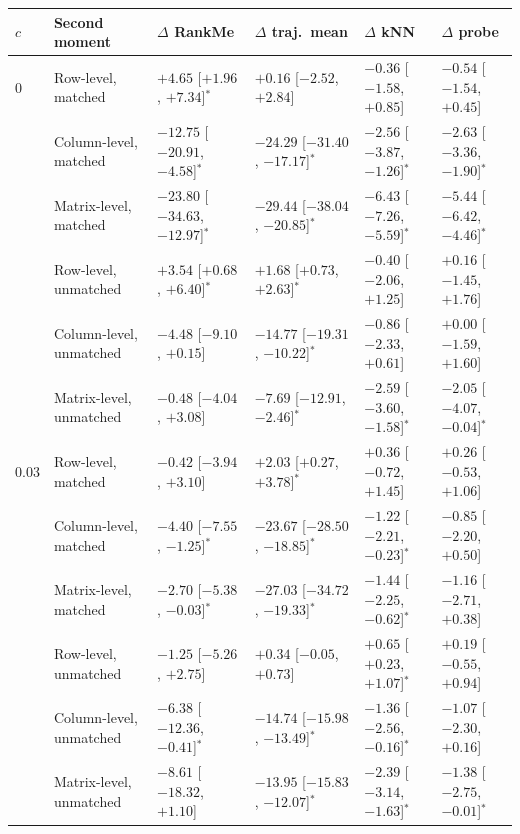 \begin{tabular}{llllll}
\toprule
$c$ & Second moment & $\Delta$ RankMe & $\Delta$ traj.\ mean & $\Delta$ kNN & $\Delta$ probe \\
\midrule
0 & Row-level, matched & $+4.65$ [$+1.96$, $+7.34$]$^{*}$ & $+0.16$ [$-2.52$, $+2.84$] & $-0.36$ [$-1.58$, $+0.85$] & $-0.54$ [$-1.54$, $+0.45$] \\
 & Column-level, matched & $-12.75$ [$-20.91$, $-4.58$]$^{*}$ & $-24.29$ [$-31.40$, $-17.17$]$^{*}$ & $-2.56$ [$-3.87$, $-1.26$]$^{*}$ & $-2.63$ [$-3.36$, $-1.90$]$^{*}$ \\
 & Matrix-level, matched & $-23.80$ [$-34.63$, $-12.97$]$^{*}$ & $-29.44$ [$-38.04$, $-20.85$]$^{*}$ & $-6.43$ [$-7.26$, $-5.59$]$^{*}$ & $-5.44$ [$-6.42$, $-4.46$]$^{*}$ \\
 & Row-level, unmatched & $+3.54$ [$+0.68$, $+6.40$]$^{*}$ & $+1.68$ [$+0.73$, $+2.63$]$^{*}$ & $-0.40$ [$-2.06$, $+1.25$] & $+0.16$ [$-1.45$, $+1.76$] \\
 & Column-level, unmatched & $-4.48$ [$-9.10$, $+0.15$] & $-14.77$ [$-19.31$, $-10.22$]$^{*}$ & $-0.86$ [$-2.33$, $+0.61$] & $+0.00$ [$-1.59$, $+1.60$] \\
 & Matrix-level, unmatched & $-0.48$ [$-4.04$, $+3.08$] & $-7.69$ [$-12.91$, $-2.46$]$^{*}$ & $-2.59$ [$-3.60$, $-1.58$]$^{*}$ & $-2.05$ [$-4.07$, $-0.04$]$^{*}$ \\
\midrule
0.03 & Row-level, matched & $-0.42$ [$-3.94$, $+3.10$] & $+2.03$ [$+0.27$, $+3.78$]$^{*}$ & $+0.36$ [$-0.72$, $+1.45$] & $+0.26$ [$-0.53$, $+1.06$] \\
 & Column-level, matched & $-4.40$ [$-7.55$, $-1.25$]$^{*}$ & $-23.67$ [$-28.50$, $-18.85$]$^{*}$ & $-1.22$ [$-2.21$, $-0.23$]$^{*}$ & $-0.85$ [$-2.20$, $+0.50$] \\
 & Matrix-level, matched & $-2.70$ [$-5.38$, $-0.03$]$^{*}$ & $-27.03$ [$-34.72$, $-19.33$]$^{*}$ & $-1.44$ [$-2.25$, $-0.62$]$^{*}$ & $-1.16$ [$-2.71$, $+0.38$] \\
 & Row-level, unmatched & $-1.25$ [$-5.26$, $+2.75$] & $+0.34$ [$-0.05$, $+0.73$] & $+0.65$ [$+0.23$, $+1.07$]$^{*}$ & $+0.19$ [$-0.55$, $+0.94$] \\
 & Column-level, unmatched & $-6.38$ [$-12.36$, $-0.41$]$^{*}$ & $-14.74$ [$-15.98$, $-13.49$]$^{*}$ & $-1.36$ [$-2.56$, $-0.16$]$^{*}$ & $-1.07$ [$-2.30$, $+0.16$] \\
 & Matrix-level, unmatched & $-8.61$ [$-18.32$, $+1.10$] & $-13.95$ [$-15.83$, $-12.07$]$^{*}$ & $-2.39$ [$-3.14$, $-1.63$]$^{*}$ & $-1.38$ [$-2.75$, $-0.01$]$^{*}$ \\
\bottomrule
\end{tabular}
